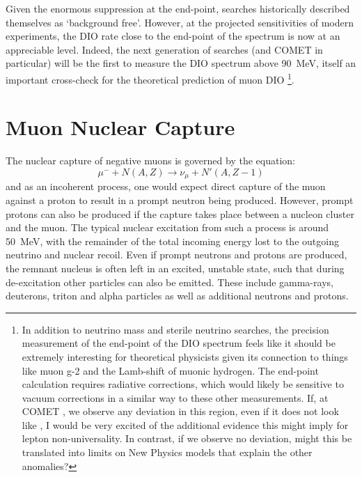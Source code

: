 Given the enormous suppression at the end-point, \mueconv searches historically described themselves as `background free'.
However, at the projected sensitivities of modern experiments, the \ac{DIO} rate close to the end-point of the spectrum is now at an appreciable level.
Indeed, the next generation of searches (and COMET \phaseI in particular) will be the first to measure the \ac{DIO} spectrum above 90~MeV, itself an important cross-check for the theoretical prediction of muon \ac{DIO}%
\footnote{In addition to neutrino mass and sterile neutrino searches, the precision measurement of the end-point of the DIO spectrum feels like it should be extremely interesting for theoretical physicists given  its connection to things like muon g-2 and the Lamb-shift of muonic hydrogen. The end-point calculation requires radiative corrections, which would likely be sensitive to vacuum corrections in a similar way to these other measurements.  If, at COMET \phaseI, we observe any deviation in this region, even if it does not look like \mueconv, I would be very excited of the additional evidence this might imply for lepton non-universality.  In contrast, if we observe no deviation, might this be translated into limits on New Physics models that explain the other anomalies?}.

\section{Muon Nuclear Capture}
The nuclear capture of negative muons is governed by the equation:
\begin{equation}
\mu^-+N(A,Z)\rightarrow \nu_\mu+N'(A,Z-1)
\end{equation}
and as an incoherent process, one would expect direct capture of the muon against a proton to result in a prompt neutron being produced.
However, prompt protons can also be produced if the capture takes place between a nucleon cluster and the muon.
The typical nuclear excitation from such a process is around 50~MeV, with the remainder of the total incoming energy lost to the outgoing neutrino and nuclear recoil.
Even if prompt neutrons and protons are produced, the remnant nucleus is often left in an excited, unstable state, such that during de-excitation other particles can also be emitted.
These include gamma-rays, deuterons, triton and alpha particles as well as additional neutrons and protons.
\FigMuecMuCapture


